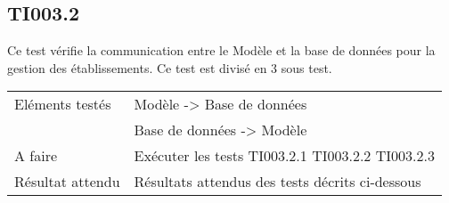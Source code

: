 
\subsection{TI003.2}
  		Ce test vérifie la communication entre le Modèle et la base de données pour la gestion des établissements. Ce test est divisé en 3 sous test.
  	
 
 	 \begin{center}
    	 	\begin{tabular}[h]{|p{}|p{}|}
		\hline
			Eléments testés & Modèle -> Base de données  \\
						    &  Base de données -> Modèle \\\hline
    			A faire & Exécuter les tests TI003.2.1 TI003.2.2 TI003.2.3 \\\hline
    			Résultat attendu & Résultats attendus des tests décrits ci-dessous \\\hline
     	\end{tabular}
  	\end{center}	
  	

  		




  		
  		

